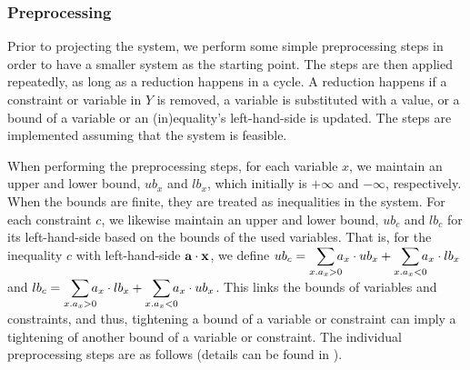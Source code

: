 \subsubsection{Preprocessing}
Prior to projecting the system, we perform some simple preprocessing steps in order to have a smaller system as the starting point. The steps are then applied repeatedly, as long as a reduction happens in a cycle. A reduction happens if a constraint or variable in $Y$ is removed, a variable is substituted with a value, or a bound of a variable or an (in)equality's left-hand-side is updated. The steps are implemented assuming that the system is feasible.

When performing the preprocessing steps, for each variable $x$, we maintain an upper and lower bound, $ub_x$ and $lb_x$, which initially is $+\infty$ and $-\infty$, respectively. When the bounds are finite, they are treated as inequalities in the system. For each constraint $c$, we likewise maintain an upper and lower bound, $ub_c$ and $lb_c$ for its left-hand-side {based on the bounds of the used variables}. That is, for the inequality $c$ with left-hand-side $\mathbf{a}\cdot\mathbf{x}$, we define $ub_c = \smashoperator[r]{\sum_{x. a_x>0}}a_x\cdot ub_x + \smashoperator[r]{\sum_{x.a_x<0}}a_x\cdot lb_x$ and $lb_c = \smashoperator[r]{\sum_{x. a_x>0}}a_x\cdot lb_x + \smashoperator[r]{\sum_{x.a_x<0}}a_x\cdot ub_x$. 
This links the bounds of variables and constraints, and thus, tightening a bound of a variable or constraint can imply a tightening of another bound of a variable or constraint. The individual preprocessing steps are as follows (details can be found in \cite{MyTechRep}). 
